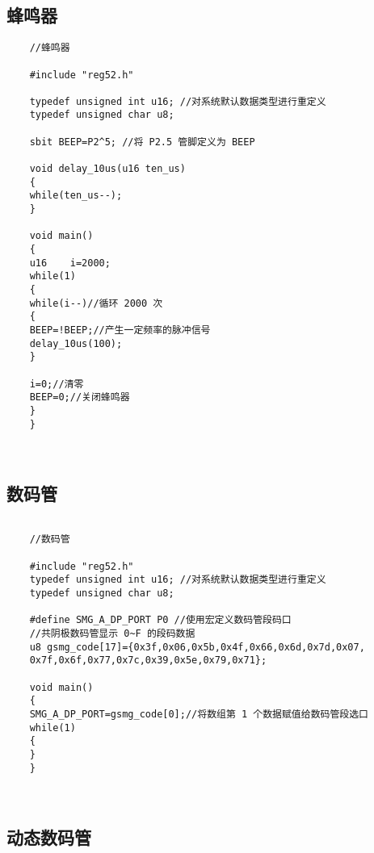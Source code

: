 \documentclass[cn,11pt]{elegantbook}
\begin{document}
\subsection{蜂鸣器}
\begin{lstlisting}
    //蜂鸣器

    #include "reg52.h"
    
    typedef unsigned int u16; //对系统默认数据类型进行重定义
    typedef unsigned char u8;
    
    sbit BEEP=P2^5; //将 P2.5 管脚定义为 BEEP
    
    void delay_10us(u16 ten_us)
    {
    while(ten_us--);
    }
    
    void main()
    {
    u16    i=2000;
    while(1)
    {
    while(i--)//循环 2000 次
    {
    BEEP=!BEEP;//产生一定频率的脉冲信号
    delay_10us(100);
    }
    
    i=0;//清零
    BEEP=0;//关闭蜂鸣器
    }
    }
    
    
\end{lstlisting}

\subsection{数码管}

\begin{lstlisting}

    //数码管

    #include "reg52.h"
    typedef unsigned int u16; //对系统默认数据类型进行重定义
    typedef unsigned char u8;
    
    #define SMG_A_DP_PORT P0 //使用宏定义数码管段码口
    //共阴极数码管显示 0~F 的段码数据
    u8 gsmg_code[17]={0x3f,0x06,0x5b,0x4f,0x66,0x6d,0x7d,0x07,
    0x7f,0x6f,0x77,0x7c,0x39,0x5e,0x79,0x71};
    
    void main()
    {
    SMG_A_DP_PORT=gsmg_code[0];//将数组第 1 个数据赋值给数码管段选口
    while(1)
    {
    }
    }
    
    
\end{lstlisting}



\subsection{动态数码管}
\end{document}
